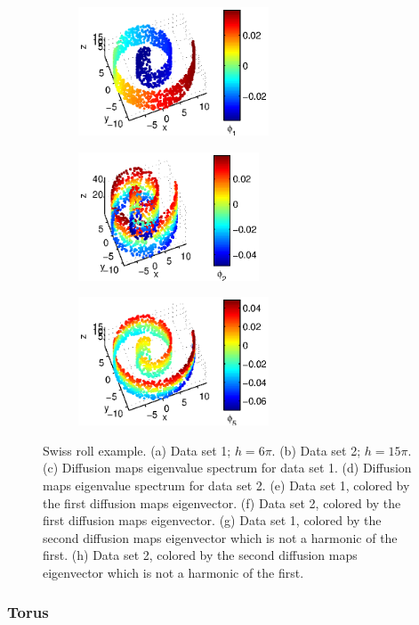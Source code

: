 \documentclass[preprint]{elsarticle}
\begin{document}
\begin{figure}
\begin{subfigure}{0.45\textwidth}
\caption{}
\end{subfigure}
\hfill
\begin{subfigure}{0.45\textwidth}
\centering
\includegraphics[height=1.5in]{swissroll2_color1}
\caption{}
\end{subfigure}
\hfill
\begin{subfigure}{0.45\textwidth}
\centering
\includegraphics[height=1.5in]{swissroll1_color2}
\caption{}
\end{subfigure}
\hfill
\begin{subfigure}{0.45\textwidth}
\centering
\includegraphics[height=1.5in]{swissroll2_color2}
\caption{}
\end{subfigure}
%
\caption{Swiss roll example. (a) Data set 1; $h=6 \pi$. (b) Data set 2; $h = 15 \pi$. (c) Diffusion maps eigenvalue spectrum for data set 1. (d) Diffusion maps eigenvalue spectrum for data set 2. (e) Data set 1, colored by the first diffusion maps eigenvector. (f) Data set 2, colored by the first diffusion maps eigenvector. (g) Data set 1, colored by the second diffusion maps eigenvector which is not a harmonic of the first. (h) Data set 2, colored by the second diffusion maps eigenvector which is not a harmonic of the first. } 
\label{fig:swiss_rolls}	
\end{figure}

\subsubsection{Torus}
\end{document}
